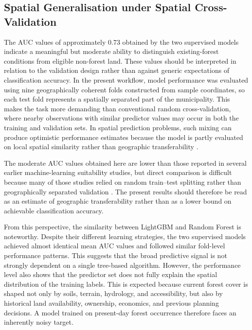 \documentclass[land,article,submit,moreauthors]{Definitions/mdpi}
\begin{document}
\subsection{Spatial Generalisation under Spatial Cross-Validation}
\label{sec:discussion-spatial}

The AUC values of approximately 0.73 obtained by the two supervised models indicate a meaningful but moderate ability to distinguish existing-forest conditions from eligible non-forest land. These values should be interpreted in relation to the validation design rather than against generic expectations of classification accuracy. In the present workflow, model performance was evaluated using nine geographically coherent folds constructed from sample coordinates, so each test fold represents a spatially separated part of the municipality. This makes the task more demanding than conventional random cross-validation, where nearby observations with similar predictor values may occur in both the training and validation sets. In spatial prediction problems, such mixing can produce optimistic performance estimates because the model is partly evaluated on local spatial similarity rather than geographic transferability \citep{meyer2022,roberts2017}.

The moderate AUC values obtained here are lower than those reported in several earlier machine-learning suitability studies, but direct comparison is difficult because many of those studies relied on random train--test splitting rather than geographically separated validation \citep{taghizadeh2020,buthelezi2024review}. The present results should therefore be read as an estimate of geographic transferability rather than as a lower bound on achievable classification accuracy.

From this perspective, the similarity between LightGBM and Random Forest is noteworthy. Despite their different learning strategies, the two supervised models achieved almost identical mean AUC values and followed similar fold-level performance patterns. This suggests that the broad predictive signal is not strongly dependent on a single tree-based algorithm. However, the performance level also shows that the predictor set does not fully explain the spatial distribution of the training labels. This is expected because current forest cover is shaped not only by soils, terrain, hydrology, and accessibility, but also by historical land availability, ownership, economics, and previous planning decisions. A model trained on present-day forest occurrence therefore faces an inherently noisy target.
\end{document}
